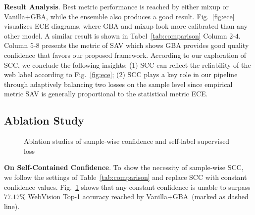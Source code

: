 \documentclass[runningheads]{llncs}
\begin{document}
\textbf{Result Analysis}.
Best metric performance is reached by either mixup or Vanilla+GBA, while the ensemble also produces a good result. Fig.~\ref{fig:ece} visualizes ECE diagrams, where GBA and mixup look more calibrated than any other model. A similar result is shown in Tabel~\ref{tab:comparison} Column $2$-$4$. Column $5$-$8$ presents the metric of SAV which shows GBA provides good quality confidence that favors our proposed framework. According to our exploration of SCC, we conclude the following insights:
(1) SCC can reflect the reliability of the web label according to Fig.~\ref{fig:ece};
(2) SCC plays a key role in our pipeline through adaptively balancing two losses on the sample level since empirical metric SAV is generally proportional to the statistical metric ECE.
    
\subsection{Ablation Study}
\label{S:exp-ablation}

\begin{figure}[b]
\centering
{}
\hfill
{}
	\caption{Ablation studies of sample-wise confidence and self-label supervised loss}
\label{fig:ablation}
\end{figure}

\textbf{On Self-Contained Confidence}.
To show the necessity of sample-wise SCC, we follow the settings of Table~\ref{tab:comparison} and replace SCC with constant confidence values.
Fig.~\ref{fig:ablation} shows that any constant confidence is unable to surpass $77.17\%$ WebVision Top-1 accuracy reached by Vanilla+GBA~(marked as dashed line).
\end{document}
